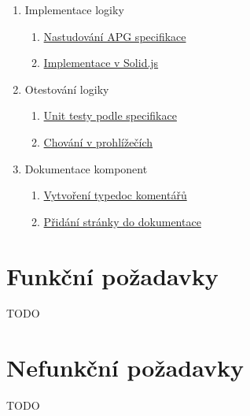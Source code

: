 \begin{enumerate}[label=\arabic*.]
\begin{enumerate}[label*=\arabic*.]
\begin{enumerate}[label*=\arabic*.]
                        \item Implementace logiky
                              \begin{enumerate}[label*=\arabic*.]
                                  \item \ul{Nastudování APG specifikace}
                                  \item \ul{Implementace v Solid.js}
                              \end{enumerate}
                        \item Otestování logiky
                              \begin{enumerate}[label*=\arabic*.]
                                  \item \ul{Unit testy podle specifikace}
                                  \item \ul{Chování v prohlížečích}
                              \end{enumerate}
                        \item Dokumentace komponent
                              \begin{enumerate}[label*=\arabic*.]
                                  \item \ul{Vytvoření typedoc komentářů}
                                  \item \ul{Přidání stránky do dokumentace}
                              \end{enumerate}
                    \end{enumerate}
          \end{enumerate}
\end{enumerate}

\section{Funkční požadavky}

TODO

\section{Nefunkční požadavky}

TODO
